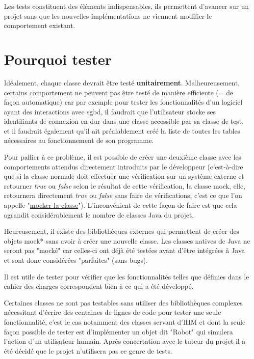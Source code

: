 Les tests constituent des éléments indispensables, ils permettent d'avancer sur un projet sans que les nouvelles implémentations ne viennent modifier le comportement existant.
\section{Pourquoi tester}

Idéalement, chaque classe devrait être testé \textbf{unitairement}.
Malheureusement, certains comportement ne peuvent pas être testé de manière efficiente (= de façon automatique) car par exemple pour tester les fonctionnalités d'un logiciel ayant des interactions avec \gls{sgbd}, il faudrait que l'utilisateur stocke ses identifiants de connexion en dur dans une classe accessible par sa classe de test, et il faudrait également qu'il ait préalablement créé la liste de toutes les tables nécessaires au fonctionnement de son programme.
\bigbreak

Pour pallier à ce problème, il est possible de créer une deuxième classe avec les comportements attendus directement introduits par le développeur (c'est-à-dire que si la classe normale doit effectuer une vérification sur un système externe et retourner \textit{true} ou \textit{false} selon le résultat de cette vérification, la classe mock, elle, retournera directement \textit{true} ou \textit{false} sans faire de vérifications, c'est ce que l'on appelle "\underline{mocker la classe}"). L'inconvénient de cette façon de faire est que cela agrandit considérablement le nombre de classes Java du projet.

\bigbreak
  Heureusement, il existe des bibliothèques externes qui permettent de créer des objets \gls{mock}* sans avoir à créer une nouvelle classe.
Les classes natives de Java ne seront pas "mocké" car celles-ci ont déjà été testées avant d'être intégrées à Java et sont donc considérées "parfaites" (sans bugs).

Il est utile de tester pour vérifier que les fonctionnalités telles que définies dans le cahier des charges correspondent bien à ce qui a été développé.

Certaines classes ne sont pas testables sans utiliser des bibliothèques complexes nécessitant d'écrire des centaines de lignes de code pour tester une seule fonctionnalité, c'est le cas notamment des classes servant d'IHM et dont la seule façon possible de tester est d'implémenter un objet dit "Robot" qui simulera l'action d'un utilisateur humain. Après concertation avec le tuteur du projet il a été décidé que le projet n'utilisera pas ce genre de tests.

